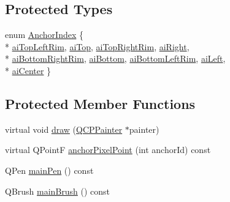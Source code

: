 \subsection*{Protected Types}
\begin{DoxyCompactItemize}
\item 
enum \hyperlink{class_q_c_p_item_ellipse_a415009889543169f35b70795f415e45e}{Anchor\+Index} \{ \\*
\hyperlink{class_q_c_p_item_ellipse_a415009889543169f35b70795f415e45eab2538849b88921e7fc1dcc15b2a6109d}{ai\+Top\+Left\+Rim}, 
\hyperlink{class_q_c_p_item_ellipse_a415009889543169f35b70795f415e45ea83e55b0c1799baac1eecab52bcbe096d}{ai\+Top}, 
\hyperlink{class_q_c_p_item_ellipse_a415009889543169f35b70795f415e45ea415d82233c14f0c70c245d50e706e75b}{ai\+Top\+Right\+Rim}, 
\hyperlink{class_q_c_p_item_ellipse_a415009889543169f35b70795f415e45ea0f0dcfdf87d9405b53b2129740fb6ba6}{ai\+Right}, 
\\*
\hyperlink{class_q_c_p_item_ellipse_a415009889543169f35b70795f415e45eab62732e96d67801d50c6a9bdebc374d0}{ai\+Bottom\+Right\+Rim}, 
\hyperlink{class_q_c_p_item_ellipse_a415009889543169f35b70795f415e45ea5894287dedaeec1f48394fd950ccff5b}{ai\+Bottom}, 
\hyperlink{class_q_c_p_item_ellipse_a415009889543169f35b70795f415e45ea7b8101bfc590af8ce32961f6545c4f90}{ai\+Bottom\+Left\+Rim}, 
\hyperlink{class_q_c_p_item_ellipse_a415009889543169f35b70795f415e45eae74dad00419a0e1f42877510158fb922}{ai\+Left}, 
\\*
\hyperlink{class_q_c_p_item_ellipse_a415009889543169f35b70795f415e45ea580ec0e9b9fd1488fccf5783e52c0c02}{ai\+Center}
 \}
\end{DoxyCompactItemize}
\subsection*{Protected Member Functions}
\begin{DoxyCompactItemize}
\item 
virtual void \hyperlink{class_q_c_p_item_ellipse_afe97ec827adb05f000fe007783faae3c}{draw} (\hyperlink{class_q_c_p_painter}{Q\+C\+P\+Painter} $\ast$painter)
\item 
virtual Q\+Point\+F \hyperlink{class_q_c_p_item_ellipse_ad3c607304dba081e2f778b6a81b903bb}{anchor\+Pixel\+Point} (int anchor\+Id) const 
\item 
Q\+Pen \hyperlink{class_q_c_p_item_ellipse_afc78d49ed5ffa886bccf18f297f83d30}{main\+Pen} () const 
\item 
Q\+Brush \hyperlink{class_q_c_p_item_ellipse_a2a9757204877c9d0fd07adfb26d6b1d8}{main\+Brush} () const 
\end{DoxyCompactItemize}
